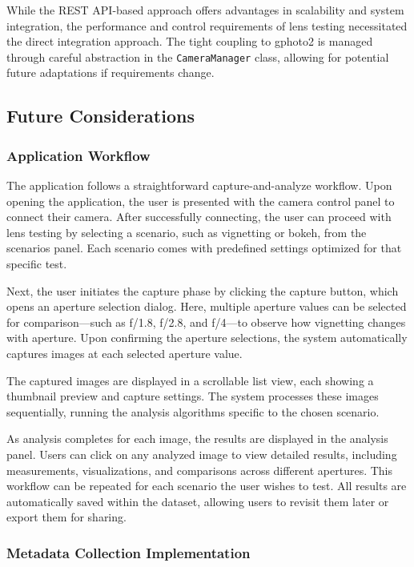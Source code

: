 While the REST API-based approach offers advantages in scalability and system integration, the performance and control requirements of lens testing necessitated the direct integration approach. The tight coupling to gphoto2 is managed through careful abstraction in the \texttt{CameraManager} class, allowing for potential future adaptations if requirements change.

\subsection{Future Considerations}

\subsubsection{Application Workflow}

The application follows a straightforward capture-and-analyze workflow. Upon opening the application, the user is presented with the camera control panel to connect their camera. After successfully connecting, the user can proceed with lens testing by selecting a scenario, such as vignetting or bokeh, from the scenarios panel. Each scenario comes with predefined settings optimized for that specific test.

Next, the user initiates the capture phase by clicking the capture button, which opens an aperture selection dialog. Here, multiple aperture values can be selected for comparison—such as f/1.8, f/2.8, and f/4—to observe how vignetting changes with aperture. Upon confirming the aperture selections, the system automatically captures images at each selected aperture value.

The captured images are displayed in a scrollable list view, each showing a thumbnail preview and capture settings. The system processes these images sequentially, running the analysis algorithms specific to the chosen scenario.

As analysis completes for each image, the results are displayed in the analysis panel. Users can click on any analyzed image to view detailed results, including measurements, visualizations, and comparisons across different apertures. This workflow can be repeated for each scenario the user wishes to test. All results are automatically saved within the dataset, allowing users to revisit them later or export them for sharing.

\subsubsection{Metadata Collection Implementation}

